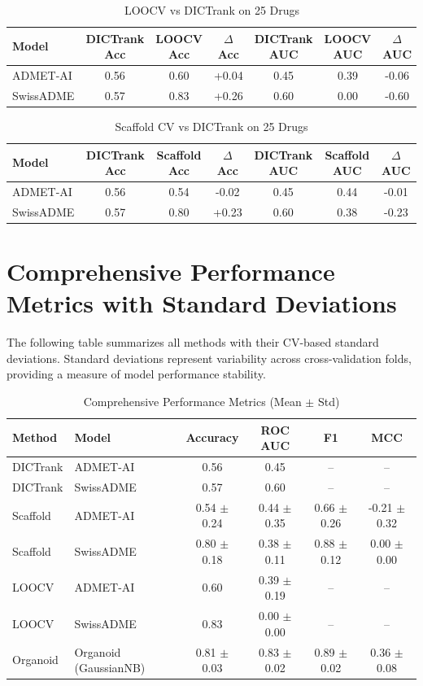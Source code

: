 \documentclass[11pt]{article}
\begin{document}
\begin{table}[H]
\centering
\caption{LOOCV vs DICTrank on 25 Drugs}
\begin{tabular}{lcccccc}
\toprule
\textbf{Model} & \textbf{DICTrank Acc} & \textbf{LOOCV Acc} & \textbf{$\Delta$ Acc} & \textbf{DICTrank AUC} & \textbf{LOOCV AUC} & \textbf{$\Delta$ AUC} \\
\midrule
ADMET-AI & 0.56 & 0.60 & +0.04 & 0.45 & 0.39 & -0.06 \\
SwissADME & 0.57 & 0.83 & +0.26 & 0.60 & 0.00 & -0.60 \\
\bottomrule
\end{tabular}
\end{table}

\begin{table}[H]
\centering
\caption{Scaffold CV vs DICTrank on 25 Drugs}
\begin{tabular}{lcccccc}
\toprule
\textbf{Model} & \textbf{DICTrank Acc} & \textbf{Scaffold Acc} & \textbf{$\Delta$ Acc} & \textbf{DICTrank AUC} & \textbf{Scaffold AUC} & \textbf{$\Delta$ AUC} \\
\midrule
ADMET-AI & 0.56 & 0.54 & -0.02 & 0.45 & 0.44 & -0.01 \\
SwissADME & 0.57 & 0.80 & +0.23 & 0.60 & 0.38 & -0.23 \\
\bottomrule
\end{tabular}
\end{table}


\section{Comprehensive Performance Metrics with Standard Deviations}

The following table summarizes all methods with their CV-based standard deviations.
Standard deviations represent variability across cross-validation folds, providing
a measure of model performance stability.

\begin{table}[H]
\centering
\caption{Comprehensive Performance Metrics (Mean $\pm$ Std)}
\small
\begin{tabular}{llcccc}
\toprule
\textbf{Method} & \textbf{Model} & \textbf{Accuracy} & \textbf{ROC AUC} & \textbf{F1} & \textbf{MCC} \\
\midrule
DICTrank & ADMET-AI & 0.56 & 0.45 & -- & -- \\
DICTrank & SwissADME & 0.57 & 0.60 & -- & -- \\
\midrule
Scaffold & ADMET-AI & 0.54 $\pm$ 0.24 & 0.44 $\pm$ 0.35 & 0.66 $\pm$ 0.26 & -0.21 $\pm$ 0.32 \\
Scaffold & SwissADME & 0.80 $\pm$ 0.18 & 0.38 $\pm$ 0.11 & 0.88 $\pm$ 0.12 & 0.00 $\pm$ 0.00 \\
\midrule
LOOCV & ADMET-AI & 0.60 & 0.39 $\pm$ 0.19 & -- & -- \\
LOOCV & SwissADME & 0.83 & 0.00 $\pm$ 0.00 & -- & -- \\
\midrule
Organoid & Organoid (GaussianNB) & 0.81 $\pm$ 0.03 & 0.83 $\pm$ 0.02 & 0.89 $\pm$ 0.02 & 0.36 $\pm$ 0.08 \\
\bottomrule
\end{tabular}
\end{table}
\end{document}
